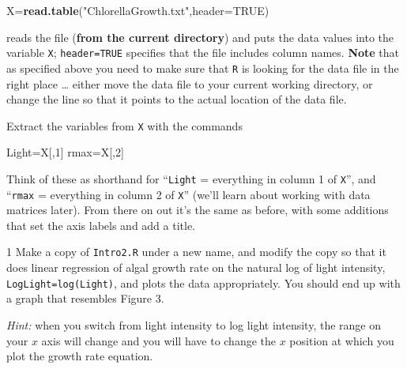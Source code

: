 \documentclass[11pt,]{article}
\newenvironment{Shaded}{\begin{snugshade}}{\end{snugshade}}
\newcommand{\DataTypeTok}[1]{\textcolor[rgb]{0.13,0.29,0.53}{#1}}
\newcommand{\DecValTok}[1]{\textcolor[rgb]{0.00,0.00,0.81}{#1}}
\newcommand{\KeywordTok}[1]{\textcolor[rgb]{0.13,0.29,0.53}{\textbf{#1}}}
\newcommand{\NormalTok}[1]{#1}
\newcommand{\OtherTok}[1]{\textcolor[rgb]{0.56,0.35,0.01}{#1}}
\newcommand{\StringTok}[1]{\textcolor[rgb]{0.31,0.60,0.02}{#1}}
\let\BeginKnitrBlock\begin \let\EndKnitrBlock\end
\begin{document}
\begin{Shaded}
\begin{Highlighting}[]
\NormalTok{X=}\KeywordTok{read.table}\NormalTok{(}\StringTok{"ChlorellaGrowth.txt"}\NormalTok{,}\DataTypeTok{header=}\OtherTok{TRUE}\NormalTok{)}
\end{Highlighting}
\end{Shaded}

reads the file (\textbf{from the current directory}) and puts the data values into the variable \texttt{X}; \texttt{header=TRUE} specifies that the file includes column names. \textbf{Note} that as specified above you need to make sure that \texttt{R} is looking for the data file in the right place \ldots{} either move the data file to your current working directory, or change the line so that it points to the actual location of the data file.

Extract the variables from \texttt{X} with the commands

\begin{Shaded}
\begin{Highlighting}[]
\NormalTok{Light=X[,}\DecValTok{1}\NormalTok{]}
\NormalTok{rmax=X[,}\DecValTok{2}\NormalTok{]}
\end{Highlighting}
\end{Shaded}

Think of these as shorthand for ``\texttt{Light} = everything in column 1 of \texttt{X}'', and ``\texttt{rmax} = everything in column 2 of \texttt{X}'' (we'll learn about working with data matrices later). From there on out it's the same as before, with some additions that set the axis labels and add a title.

\BeginKnitrBlock{exercisebox}{1}
Make a copy of \texttt{Intro2.R} under a new name, and modify the copy so that it does linear regression of algal growth rate on the natural log of light intensity, \texttt{LogLight=log(Light)}, and plots the data appropriately. You should end up with a graph that resembles Figure 3.

\emph{Hint:} when you switch from light intensity to log light intensity, the range on your \(x\) axis will change and you will have to change the \(x\) position at which you plot the growth rate equation.
\EndKnitrBlock{exercisebox}
\end{document}

